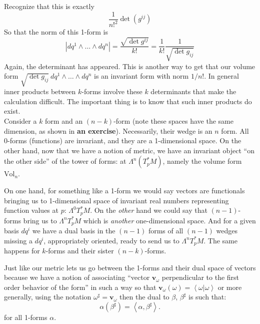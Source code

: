 	Recognize that this is exactly 
	\begin{equation}
		\frac{1}{n!^2} \det(g^{ij})
	\end{equation}
	So that the norm of this 1-form is
	\begin{equation}
		|dq^1 \wedge \dots \wedge dq^n| = \frac{\sqrt{\det g^{ij}}}{k!} = \frac{1}{k!} \frac{1}{\sqrt{\det{g_{ij}}}}
	\end{equation}
	Again, the determinant has appeared. This is another way to get that our volume form $\sqrt{\det g_{ij}} ~ dq^1 \wedge \dots \wedge dq^n$ is an invariant form with norm $1/n!$. In general inner products between $k$-forms involve these $k$ determinants that make the calculation difficult. The important thing is to know that such inner products do exist.\\
	
	Consider a $k$ form and an $(n-k)$-form (note these spaces have the same dimension, as shown in \textbf{an exercise}). Necessarily, their wedge is an $n$ form. All 0-forms (functions) are invariant, and they are a 1-dimensional space. On the other hand, now that we have a notion of metric, we have an invariant object ``on the other side'' of the tower of forms: at $\Lambda^n (T^*_p M)$, namely the volume form $\mathrm{Vol}_n$. 
	
	On one hand, for something like a 1-form we would say vectors are functionals bringing us to 1-dimensional space of invariant real numbers representing function values at $p$: $\Lambda^0 T^*_p M$. On the \emph{other} hand we could say that $(n-1)$-forms bring us to $\Lambda^n T^*_p M$ which is \emph{another} one-dimensional space. And for a given basis $dq^i$ we have a dual basis in the $(n-1)$ forms of all $(n-1)$ wedges missing a $dq^i$, appropriately oriented, ready to send us to $\Lambda^n T^*_p M$. The same happens for $k$-forms and their sister $(n-k)$-forms.
	
	Just like our metric lets us go between the 1-forms and their dual space of vectors because we have a notion of associating ``vector $\mathbf v_\omega$ perpendicular to the first order behavior of the form'' in such a way so that $\mathbf v_\omega(\omega) = \left< \omega | \omega \right>$ or more generally, using the notation $\omega^\sharp = \mathbf v_\omega$ then the dual to $\beta$, $\beta^\sharp$ is such that: 
	\begin{equation}
		\alpha(\beta^\sharp) = \left< \alpha, \beta^\sharp \right>.
	\end{equation}
	for all 1-forms $\alpha$.
		
